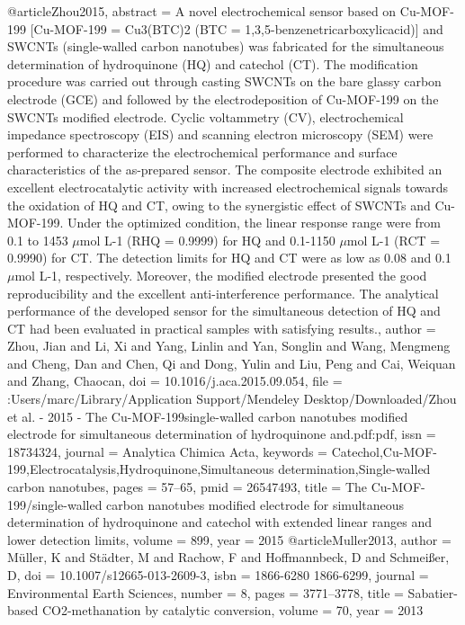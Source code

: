 @article{Zhou2015,
abstract = {A novel electrochemical sensor based on Cu-MOF-199 [Cu-MOF-199 = Cu3(BTC)2 (BTC = 1,3,5-benzenetricarboxylicacid)] and SWCNTs (single-walled carbon nanotubes) was fabricated for the simultaneous determination of hydroquinone (HQ) and catechol (CT). The modification procedure was carried out through casting SWCNTs on the bare glassy carbon electrode (GCE) and followed by the electrodeposition of Cu-MOF-199 on the SWCNTs modified electrode. Cyclic voltammetry (CV), electrochemical impedance spectroscopy (EIS) and scanning electron microscopy (SEM) were performed to characterize the electrochemical performance and surface characteristics of the as-prepared sensor. The composite electrode exhibited an excellent electrocatalytic activity with increased electrochemical signals towards the oxidation of HQ and CT, owing to the synergistic effect of SWCNTs and Cu-MOF-199. Under the optimized condition, the linear response range were from 0.1 to 1453 $\mu$mol L-1 (RHQ = 0.9999) for HQ and 0.1-1150 $\mu$mol L-1 (RCT = 0.9990) for CT. The detection limits for HQ and CT were as low as 0.08 and 0.1 $\mu$mol L-1, respectively. Moreover, the modified electrode presented the good reproducibility and the excellent anti-interference performance. The analytical performance of the developed sensor for the simultaneous detection of HQ and CT had been evaluated in practical samples with satisfying results.},
author = {Zhou, Jian and Li, Xi and Yang, Linlin and Yan, Songlin and Wang, Mengmeng and Cheng, Dan and Chen, Qi and Dong, Yulin and Liu, Peng and Cai, Weiquan and Zhang, Chaocan},
doi = {10.1016/j.aca.2015.09.054},
file = {:Users/marc/Library/Application Support/Mendeley Desktop/Downloaded/Zhou et al. - 2015 - The Cu-MOF-199single-walled carbon nanotubes modified electrode for simultaneous determination of hydroquinone and.pdf:pdf},
issn = {18734324},
journal = {Analytica Chimica Acta},
keywords = {Catechol,Cu-MOF-199,Electrocatalysis,Hydroquinone,Simultaneous determination,Single-walled carbon nanotubes},
pages = {57--65},
pmid = {26547493},
title = {{The Cu-MOF-199/single-walled carbon nanotubes modified electrode for simultaneous determination of hydroquinone and catechol with extended linear ranges and lower detection limits}},
volume = {899},
year = {2015}
}
@article{Muller2013,
author = {M{\"{u}}ller, K and St{\"{a}}dter, M and Rachow, F and Hoffmannbeck, D and Schmei{\ss}er, D},
doi = {10.1007/s12665-013-2609-3},
isbn = {1866-6280 1866-6299},
journal = {Environmental Earth Sciences},
number = {8},
pages = {3771--3778},
title = {{Sabatier-based CO2-methanation by catalytic conversion}},
volume = {70},
year = {2013}
}
